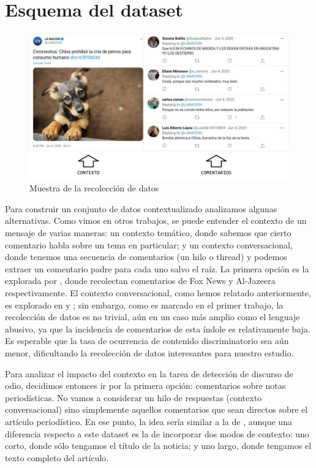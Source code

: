 \section{Esquema del dataset}



\begin{figure}[t]
    \centering
    \includegraphics[width=\textwidth]{img/idea_dataset.pdf}
    \caption{Muestra de la recolección de datos}
    \label{fig:idea_dataset}
\end{figure}

Para construir un conjunto de datos contextualizado analizamos algunas alternativas. Como vimos en otros trabajos, se puede entender el contexto de un mensaje de varias maneras: un contexto temático, donde sabemos que cierto comentario habla sobre un tema en particular; y un contexto conversacional, donde tenemos una secuencia de comentarios (un hilo o thread) y podemos extraer un comentario padre para cada uno salvo el raíz. La primera opción es la explorada por \citet{gao-huang-2017-detecting,mubarak-etal-2017-abusive}, donde recolectan comentarios de Fox News y Al-Jazeera respectivamente. El contexto conversacional, como hemos relatado anteriormente, es explorado en \citet{pavlopoulos2020toxicity} y \citet{xenos-2021-context}; sin embargo, como es marcado en el primer trabajo, la recolección de datos es no trivial, aún en un caso más amplio como el lenguaje abusivo, ya que la incidencia de comentarios de esta índole es relativamente baja. Es esperable que la tasa de ocurrencia de contenido discriminatorio sea aún menor, dificultando la recolección de datos interesantes para nuestro estudio.

Para analizar el impacto del contexto en la tarea de detección de discurso de odio, decidimos entonces ir por la primera opción: comentarios sobre notas periodísticas. No vamos a considerar un hilo de respuestas (contexto conversacional) sino simplemente aquellos comentarios que sean directos sobre el artículo periodístico. En ese punto, la idea sería similar a la de \citet{gao-huang-2017-detecting}, aunque una diferencia respecto a este dataset es la de incorporar dos modos de contexto: uno corto, donde sólo tengamos el título de la noticia; y uno largo, donde tengamos el texto completo del artículo.

